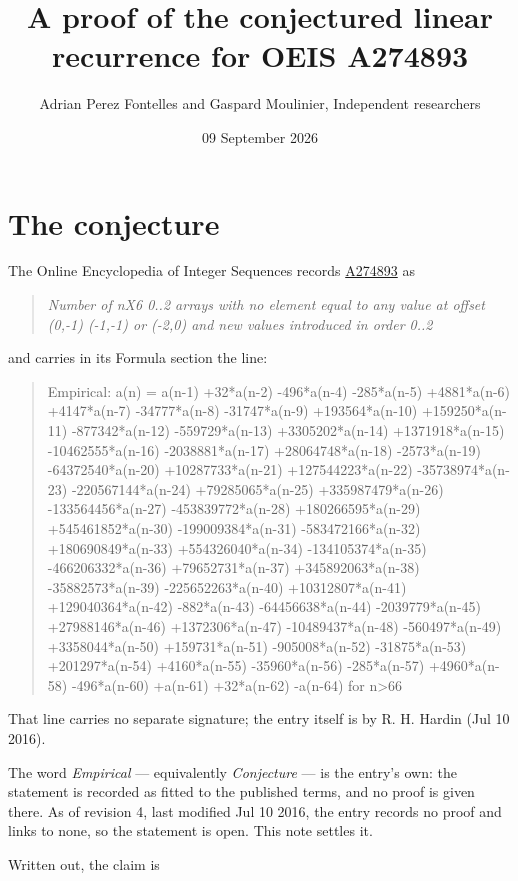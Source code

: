 \documentclass[11pt]{article}
\title{A proof of the conjectured linear recurrence for OEIS A274893}
\author{Adrian Perez Fontelles and Gaspard Moulinier, Independent researchers}
\date{09 September 2026}
\theoremstyle{definition}
\begin{document}
\maketitle
\section{The conjecture}

The Online Encyclopedia of Integer Sequences records \href{https://oeis.org/A274893}{A274893} as

\begin{quote}\itshape Number of nX6 0..2 arrays with no element equal to any value at offset (0,-1) (-1,-1) or (-2,0) and new values introduced in order 0..2\end{quote}

and carries in its Formula section the line:

\begin{quote}\ttfamily Empirical: a(n) = a(n-1) +32*a(n-2) -496*a(n-4) -285*a(n-5) +4881*a(n-6) +4147*a(n-7) -34777*a(n-8) -31747*a(n-9) +193564*a(n-10) +159250*a(n-11) -877342*a(n-12) -559729*a(n-13) +3305202*a(n-14) +1371918*a(n-15) -10462555*a(n-16) -2038881*a(n-17) +28064748*a(n-18) -2573*a(n-19) -64372540*a(n-20) +10287733*a(n-21) +127544223*a(n-22) -35738974*a(n-23) -220567144*a(n-24) +79285065*a(n-25) +335987479*a(n-26) -133564456*a(n-27) -453839772*a(n-28) +180266595*a(n-29) +545461852*a(n-30) -199009384*a(n-31) -583472166*a(n-32) +180690849*a(n-33) +554326040*a(n-34) -134105374*a(n-35) -466206332*a(n-36) +79652731*a(n-37) +345892063*a(n-38) -35882573*a(n-39) -225652263*a(n-40) +10312807*a(n-41) +129040364*a(n-42) -882*a(n-43) -64456638*a(n-44) -2039779*a(n-45) +27988146*a(n-46) +1372306*a(n-47) -10489437*a(n-48) -560497*a(n-49) +3358044*a(n-50) +159731*a(n-51) -905008*a(n-52) -31875*a(n-53) +201297*a(n-54) +4160*a(n-55) -35960*a(n-56) -285*a(n-57) +4960*a(n-58) -496*a(n-60) +a(n-61) +32*a(n-62) -a(n-64) for n>66\end{quote}

That line carries no separate signature; the entry itself is by R. H. Hardin (Jul 10 2016).

The word {\itshape Empirical} --- equivalently {\itshape Conjecture} --- is the entry's own: the statement is recorded as fitted to the published terms, and no proof is given there. As of revision 4, last modified Jul 10 2016, the entry records no proof and links to none, so the statement is open. This note settles it.

Written out, the claim is
\end{document}
